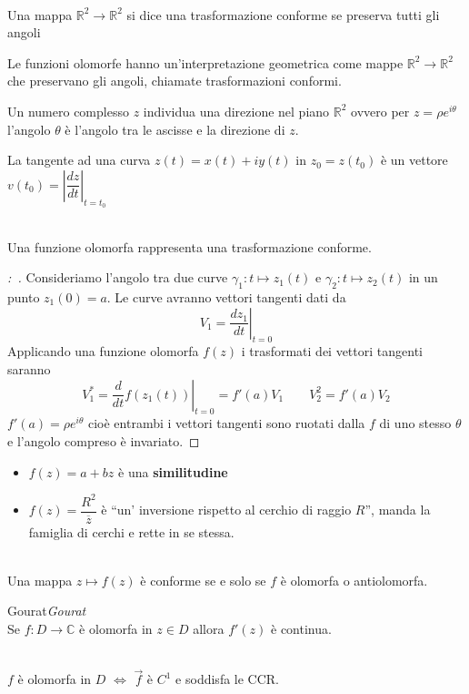 \documentclass[11pt,a4paper,twoside]{book}
\newenvironment{teorema}[1][\empty]{\begin{Teorema}{
\ifx\empty#1\relax\else\mdseries\itshape#1\\\fi
}{}}{\end{Teorema}}
\newenvironment{proposizione}[1][\empty]{\begin{Proposizione}{
\ifx\empty#1\relax\else\mdseries\itshape#1\\\fi
}{}}{\end{Proposizione}}
\newenvironment{definizione}[1][\empty]{\begin{Definizione}{
\ifx\empty#1\relax\else\mdseries\itshape#1\\\fi
}{}}{\end{Definizione}}
\newenvironment{corollario}[1][\empty]{\begin{Corollario}{
\ifx\empty#1\relax\else\mdseries\itshape#1\\\fi
}{}}{\end{Corollario}}
\newenvironment{esempio}[1][Esempio]{ 
  \begin{center}\begin{tcolorbox}[
  title={#1:~},
  width=0.9\linewidth,
  flush right,
  enhanced jigsaw, 
  colback=white, 
  frame hidden, 
  sharpish corners, arc=3mm,
  borderline west = {1pt}{0pt}{gray},
  borderline south = {1pt}{0pt}{gray},
  coltitle=black, 
  fonttitle=\small\bfseries, 
  attach title to upper, 
  breakable,
  top=2.5pt, bottom=0.3pt]\small
  }{
 \normalsize \end{tcolorbox}\end{center}
}
\newenvironment{dimo}[1][\proofname]{
	\begin{tcolorbox}[
	breakable, 
	enhanced, 
	interior hidden, 
	frame hidden, 
	borderline west = {1pt}{0pt}{gray}, 
	top=0pt, bottom=0pt, left=0pt]
\begin{proof}[#1:~]
}
{
\end{proof}
\end{tcolorbox}
}
\theoremstyle{esss}
\theoremstyle{dotless}
\numberwithin{equation}{section} %
\begin{document}
\begin{definizione}
Una mappa $\mathbb{R}^2\rightarrow\mathbb{R}^2$ si dice una trasformazione conforme se preserva tutti gli angoli
\end{definizione}

Le funzioni olomorfe hanno un'interpretazione geometrica come mappe $\mathbb{R}^2\rightarrow\mathbb{R}^2$ che preservano gli angoli, chiamate trasformazioni conformi.


Un numero complesso $z$ individua una direzione nel piano $\mathbb{R}^2$ ovvero per $z=\rho e^{i\theta}$ l'angolo $\theta$ è l'angolo tra le ascisse e la direzione di $z$.

La tangente ad una curva $z(t)=x(t)+iy(t)$ in $z_0=z(t_0)$ è un vettore $v(t_0)=\left|\dfrac{dz}{dt}\right|_{t=t_0}$ 


\begin{proposizione}
Una funzione olomorfa rappresenta una trasformazione conforme.
\end{proposizione}
\begin{dimo}
Consideriamo l'angolo tra due curve $\gamma_1:t\mapsto z_1(t)$ e $\gamma_2:t\mapsto z_2(t)$ in un punto $z_1(0)=a$.
Le curve avranno vettori tangenti dati da
\[
V_1=\left.\dfrac{ dz_1}{dt}\right|_{t=0}
\]
Applicando una funzione olomorfa $f(z)$ i trasformati dei vettori tangenti saranno
\[
V_1^*=\left.\dfrac{d}{dt} f(z_1(t))\right|_{t=0}=f'(a)V_1 \qquad V_2^2=f'(a)V_2
\]
$f'(a)=\rho e^{i\theta}$ cioè entrambi i vettori tangenti sono ruotati dalla $f$ di uno stesso $\theta$ e l'angolo compreso è invariato. \qedhere
\end{dimo}

\begin{esempio}
\begin{itemize}[label=$\cdot$]
\item $f(z)=a+bz$ è una {\bfseries similitudine}
\item $f(z)=\dfrac{R^2}{\overline{z}}$ è ``un' inversione rispetto al cerchio di raggio $R$'', manda la famiglia di cerchi e rette in se stessa.
\end{itemize}
\end{esempio}

\begin{proposizione}
Una mappa $z\mapsto f(z)$ è conforme se e solo se $f$ è olomorfa o antiolomorfa.
\end{proposizione}

\begin{teorema}[Gourat]
Se $f:D\rightarrow\mathbb{C}$ è olomorfa in $z\in D$ allora $f'(z)$ è continua.
\end{teorema}
\begin{corollario}
$f$ è olomorfa in $D$ $\iff$ $\vec{f}$ è $C^1$ e soddisfa le CCR.
\end{corollario}
\end{document}
